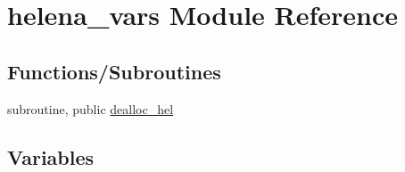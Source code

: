 \hypertarget{namespacehelena__vars}{}\section{helena\+\_\+vars Module Reference}
\label{namespacehelena__vars}
\subsection*{Functions/\+Subroutines}
\begin{DoxyCompactItemize}
\item 
subroutine, public \hyperlink{namespacehelena__vars_add7b3eea7306eca7fb45737ff915523f}{dealloc\+\_\+hel}
\end{DoxyCompactItemize}
\subsection*{Variables}
